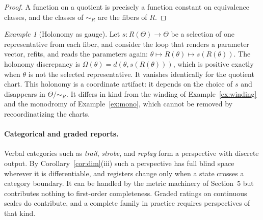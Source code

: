 \documentclass[11pt]{article}
\theoremstyle{remark}
\newtheorem{example}{Example}
\begin{document}
\begin{proof}
A function on a quotient is precisely a function constant on equivalence classes, and the classes of $\sim_R$ are the fibers of $R$.
\end{proof}

\begin{example}[Holonomy as gauge]
Let $s:R(\Theta)\to\Theta$ be a selection of one representative from each fiber, and consider the loop that renders a parameter vector, refits, and reads the parameters again: $\theta\mapsto R(\theta)\mapsto s(R(\theta))$. The holonomy discrepancy is $\Omega(\theta)=d(\theta,s(R(\theta)))$, which is positive exactly when $\theta$ is not the selected representative. It vanishes identically for the quotient chart. This holonomy is a coordinate artifact: it depends on the choice of $s$ and disappears in $\Theta/{\sim_R}$. It differs in kind from the winding of Example~\ref{ex:winding} and the monodromy of Example~\ref{ex:mono}, which cannot be removed by recoordinatizing the charts.
\end{example}

\paragraph{Categorical and graded reports.} Verbal categories such as \emph{trail}, \emph{strobe}, and \emph{replay} form a perspective with discrete output. By Corollary~\ref{cor:dim}(iii) such a perspective has full blind space wherever it is differentiable, and registers change only when a state crosses a category boundary. It can be handled by the metric machinery of Section~5 but contributes nothing to first-order completeness. Graded ratings on continuous scales do contribute, and a complete family in practice requires perspectives of that kind.
\end{document}
